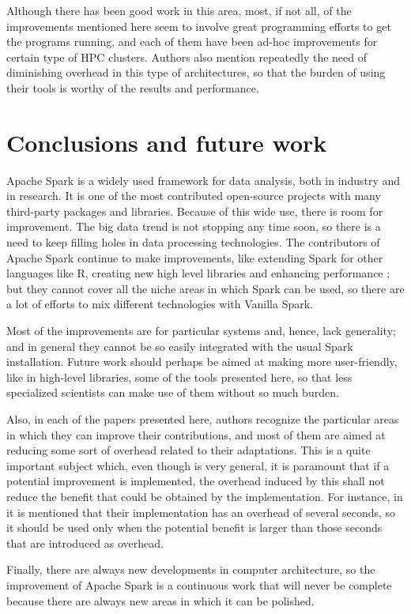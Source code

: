 \documentclass{article}
\begin{document}
Although there has been good work in this area, most, if not all, of the improvements mentioned here seem to involve great programming efforts to get the programs running, and each of them have been ad-hoc improvements for certain type of HPC clusters. Authors also mention repeatedly the need of diminishing overhead in this type of architectures, so that the burden of using their tools is worthy of the results and performance.


\section{Conclusions and future work}
\label{sec:conclusion}

Apache Spark is a widely used framework for data analysis, both in industry and in research. It is one of the most contributed open-source projects with many third-party packages and libraries. Because of this wide use, there is room for improvement. The big data trend is not stopping any time soon, so there is a need to keep filling holes in data processing technologies. The contributors of Apache Spark continue to make improvements, like extending Spark for other languages like R, creating new high level libraries and enhancing performance \cite{zaharia_apache_2016}; but they cannot cover all the niche areas in which Spark can be used, so there are a lot of efforts to mix different technologies with Vanilla Spark.

Most of the improvements are for particular systems and, hence, lack generality; and in general they cannot be so easily integrated with the usual Spark installation. Future work should perhaps be aimed at making more user-friendly, like in high-level libraries, some of the tools presented here, so that less specialized scientists can make use of them without so much burden.

Also, in each of the papers presented here, authors recognize the particular areas in which they can improve their contributions, and most of them are aimed at reducing some sort of overhead related to their adaptations. This is a quite important subject which, even though is very general, it is paramount that if a potential improvement is implemented, the overhead induced by this shall not reduce the benefit that could be obtained by the implementation. For instance, in \cite{Anderson2017} it is mentioned that their implementation has an overhead of several seconds, so it should be used only when the potential benefit is larger than those seconds that are introduced as overhead.

Finally, there are always new developments in computer architecture, so the improvement of Apache Spark is a continuous work that will never be complete because there are always new areas in which it can be polished. 


\printbibliography
\end{document}
